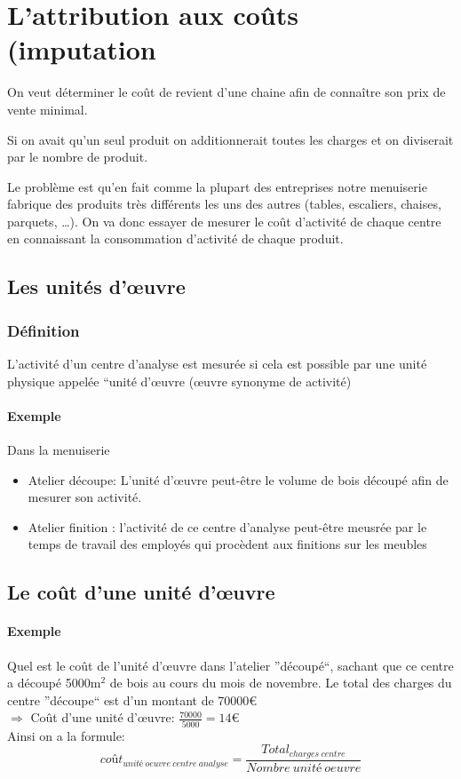\documentclass[12pt,a4paper,openany]{report}
\begin{document}
	 \section{L'attribution aux coûts (imputation}
	 On veut déterminer le coût de revient d'une chaine afin de connaître son prix de vente minimal.

	 Si on avait qu'un seul produit on additionnerait toutes les charges et on diviserait par le nombre de produit.

	 Le problème est qu'en fait comme la plupart des entreprises notre menuiserie fabrique des produits très différents les uns des autres (tables, escaliers, 
	 chaises, parquets, \ldots). On va donc essayer de mesurer le coût d'activité de chaque centre en connaissant la consommation d'activité de chaque produit.
	 \subsection{Les unités d'\oe{}uvre}
	 \subsubsection{Définition}
	 L'activité d'un centre d'analyse est mesurée si cela est possible par une unité physique appelée ``unité d'\oe{}uvre (\oe{}uvre synonyme de activité)
	 \paragraph{Exemple} Dans la menuiserie
	 \begin{itemize}
		 \item Atelier découpe: L'unité d'\oe{}uvre peut-être le volume de bois découpé afin de mesurer son activité.
		 \item Atelier finition : l'activité de ce centre d'analyse peut-être meusrée par le temps de travail des employés qui
			 procèdent aux finitions sur les meubles
	 \end{itemize}
	 \subsection{Le coût d'une unité d'\oe{}uvre}
	 \paragraph{Exemple} Quel est le coût de l'unité d'\oe{}uvre dans l'atelier ''découpé``, sachant que ce centre a découpé 5000m$^2$ de bois
	 au cours du mois de novembre.
	 Le total des charges du centre ''découpe`` est d'un montant de 70000\euro~\\
	 $\Rightarrow$ Coût d'une unité d'\oe{}uvre: $\frac{70000}{5000}=14$\euro\\
	 Ainsi on a la formule: $$coût_{unité~oeuvre~centre~analyse} = \frac{Total_{charges~centre}}{Nombre~unité~oeuvre}$$
\end{document}
